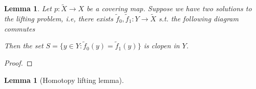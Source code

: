 \documentclass{article}
\theoremstyle{definition}
\theoremstyle{remark}
\theoremstyle{plain}
\newtheorem{lem}[defn]{Lemma}
\begin{document}
\begin{lem}
    Let $p:\tilde X\to X$ be a covering map. Suppose we have two solutions to the lifting problem, i.e, there exists $\tilde f_0,\tilde f_1:Y\to\tilde X$ s.t. the following diagram commutes
    \begin{center}
    \end{center}
    Then the set $S=\{y\in Y:\tilde f_0(y)=\tilde f_1(y)\}$ is clopen in $Y$.
\end{lem}
\begin{proof}
    
\end{proof}
\begin{lem}[Homotopy lifting lemma]
    
\end{lem}
\end{document}
